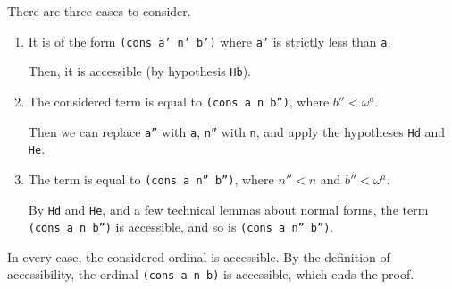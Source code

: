 There are three cases to consider.
\begin{enumerate}
\item It is of the form \texttt{(cons a' n' b')} where \texttt{a'} is strictly less than \texttt{a}.
  
  Then, it is accessible (by hypothesis \texttt{Hb}).
  
  \item The considered term  is equal to
    \texttt{(cons a n b'')}, where $b''<\omega^a$. 
    
    Then we can replace \texttt{a''} with \texttt{a}, \texttt{n''} with \texttt{n}, and apply the hypotheses \texttt{Hd} and \texttt{He}.
    
\item
  The term is equal to
  \texttt{(cons a n'' b'')}, where $n''<n$ and $b''<\omega^a$.

  
  

  By \texttt{Hd} and \texttt{He}, and a few technical lemmas about normal forms,   the term  \texttt{(cons a n b'')} is accessible, and so is \texttt{(cons a n'' b'')}.

 
\end{enumerate}

In every case, the considered ordinal is accessible. By the definition of accessibility, the ordinal \texttt{(cons a n b)} is accessible, which ends the proof. 
